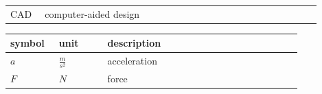 


\begin{tabular}{p{0.1\linewidth} p{0.7\linewidth} p{0.1\linewidth}}
CAD & computer-aided design
\end{tabular}


%
\begin{center}
\begin{tabular}{p{0.15\linewidth} p{0.15\linewidth} p{0.6\linewidth}}
\hline
symbol & unit & description\\\hline
$a$ & $\unit{\frac{m}{s^2}}$ & acceleration\\
$F$ & $\unit{N}$ & force\\\hline
\end{tabular}
\end{center}